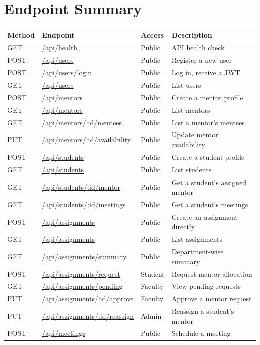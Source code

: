 \documentclass[12pt,a4paper]{report}
\newcommand{\sectionrule}{\vspace{-4pt}{\color{lightgray}\hrule height 1pt}\vspace{8pt}}
\begin{document}
\section{Endpoint Summary}
\sectionrule
\begin{longtable}{@{}p{1.3cm}p{5.2cm}p{2.1cm}p{4.3cm}@{}}
\toprule
\textbf{Method} & \textbf{Endpoint} & \textbf{Access} & \textbf{Description} \\
\midrule
\endhead
GET & \url{/api/health} & Public & API health check \\
POST & \url{/api/users} & Public & Register a new user \\
POST & \url{/api/users/login} & Public & Log in, receive a JWT \\
GET & \url{/api/users} & Public & List users \\
POST & \url{/api/mentors} & Public & Create a mentor profile \\
GET & \url{/api/mentors} & Public & List mentors \\
GET & \url{/api/mentors/:id/mentees} & Public & List a mentor's mentees \\
PUT & \url{/api/mentors/:id/availability} & Public & Update mentor availability \\
POST & \url{/api/students} & Public & Create a student profile \\
GET & \url{/api/students} & Public & List students \\
GET & \url{/api/students/:id/mentor} & Public & Get a student's assigned mentor \\
GET & \url{/api/students/:id/meetings} & Public & Get a student's meetings \\
POST & \url{/api/assignments} & Public & Create an assignment directly \\
GET & \url{/api/assignments} & Public & List assignments \\
GET & \url{/api/assignments/summary} & Public & Department-wise summary \\
POST & \url{/api/assignments/request} & Student & Request mentor allocation \\
GET & \url{/api/assignments/pending} & Faculty & View pending requests \\
PUT & \url{/api/assignments/:id/approve} & Faculty & Approve a mentor request \\
PUT & \url{/api/assignments/:id/reassign} & Admin & Reassign a student's mentor \\
POST & \url{/api/meetings} & Public & Schedule a meeting \\

\end{longtable}
\end{document}
